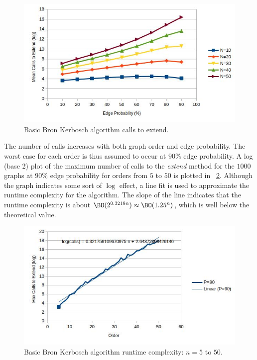 \begin{figure}[H]
  \centering
  \includegraphics[width=5in]{bron1_calls}
  \caption{Basic Bron Kerbosch algorithm calls to extend.}
  \label{fig:bron1:calls}
\end{figure}

The number of calls increases with both graph order and edge probability.  The worst case for each order is thus
assumed to occur at \(90\%\) edge probability.  A log (base 2) plot of the maximum number of calls to the
\emph{extend} method for the \(1000\) graphs at \(90\%\) edge probability for orders from \(5\) to \(50\) is
plotted in \figurename~\ref{fig:bron1:runtime}.  Although the graph indicates some sort of \(\log\) effect, a line
fit is used to approximate the runtime complexity for the algorithm.  The slope of the line indicates that the
runtime complexity is about \(\BO(2^{0.3218n})\approx\BO(1.25^n)\), which is well below the theoretical value.

\begin{figure}[H]
  \centering
  \includegraphics[width=5in]{bron1_runtime}
  \caption{Basic Bron Kerbosch algorithm runtime complexity: \(n=5\) to \(50\).}
  \label{fig:bron1:runtime}
\end{figure}

